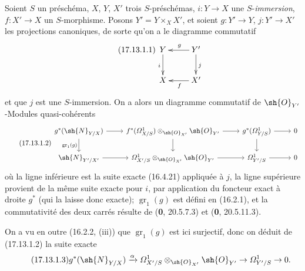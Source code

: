 \begin{env}[17.13.1]
\label{IV.17.13.1}
Soient $S$ un préschéma, $X$, $Y$, $X'$ trois $S$-préschémas, $i:Y\to X$ une $S$-\emph{immersion}, $f:X'\to X$ un $S$-morphisme. Posons $Y'=Y\times_XX'$, et soient $g:Y'\to Y$, $j:Y'\to X'$ les projections canoniques, de sorte qu'on a le diagramme commutatif
\[
\label{IV.17.13.1.1}
\tag{17.13.1.1}
\xymatrix{
  Y \ar[d]_i & Y' \ar[l]_g \ar[d]^j\\
  X & X' \ar[l]^f
}
\]
et que $j$ est une $S$-immersion. On a alors un diagramme commutatif de $\sh{O}_{Y'}$-Modules quasi-cohérents
\[
\label{IV.17.13.1.2}
\tag{17.13.1.2}
\begin{tikzcd}
  g^*(\sh{N}_{Y/X}) \ar{r} \ar{d}[swap]{\operatorname{gr}_1(g)} & f^*(\varOmega^1_{X/S})\otimes_{\sh{O}_{X'}}\sh{O}_{Y'} \ar{r} \ar{d} & g^*(\varOmega^1_{Y/S}) \ar{r} \ar{d} & 0\\
  \sh{N}_{Y'/X'} \ar{r} & \varOmega^1_{X'/S}\otimes_{\sh{O}_{X'}}\sh{O}_{Y'} \ar{r} & \varOmega^1_{Y'/S} \ar{r} & 0
\end{tikzcd}
\]
où la ligne inférieure est la suite exacte (16.4.21) appliquée à $j$, la ligne supérieure provient de la même suite exacte pour $i$, par application du foncteur exact à droite $g^*$ (qui la laisse donc exacte); $\operatorname{gr}_1(g)$ est défini en (16.2.1), et la commutativité des deux carrés résulte de (\textbf{0}, 20.5.7.3) et (\textbf{0}, 20.5.11.3).


On a vu en outre (16.2.2, (iii)) que $\operatorname{gr}_1(g)$ est ici surjectif, donc on déduit de (17.13.1.2) la suite exacte
\[
\label{IV.17.13.1.3}
\tag{17.13.1.3}
g^*(\sh{N}_{Y/X})\xrightarrow{\alpha}\varOmega^1_{X'/S}\otimes_{\sh{O}_{X'}}\sh{O}_{Y'}\to\varOmega^1_{Y'/S}\to0.
\]
\end{env}

